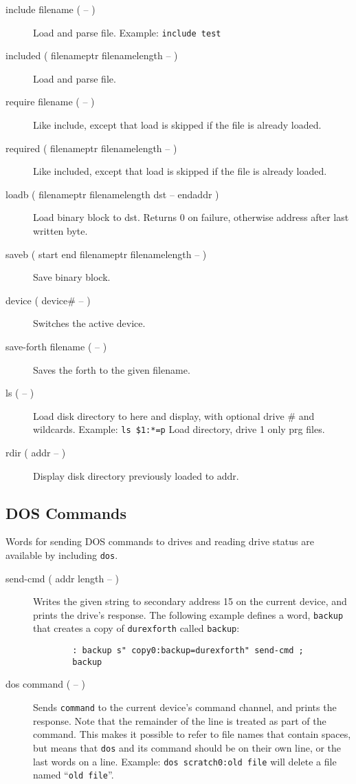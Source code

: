 \begin{description}
\item[include filename ( -- )] Load and parse file. Example: \texttt{include test}
\item[included ( filenameptr filenamelength -- )] Load and parse file.
\item[require filename ( -- )] Like include, except that load is skipped if the file is already loaded.
\item[required ( filenameptr filenamelength -- )] Like included, except that load is skipped if the file is already loaded.
\item[loadb ( filenameptr filenamelength dst -- endaddr )] Load binary block to dst. Returns 0 on failure, otherwise address after last written byte.
\item[saveb ( start end filenameptr filenamelength -- )] Save binary block.
\item[device ( device\# -- )] Switches the active device.
\item[save-forth filename ( -- )] Saves the forth to the given filename.
\item[ls ( -- )] Load disk directory to here and display, with optional drive \# and wildcards. Example: \texttt{ls \$1:*=p} Load directory, drive 1 only prg files.
\item[rdir ( addr -- )] Display disk directory previously loaded to addr.
\end{description}

\subsection{DOS Commands}

Words for sending DOS commands to drives and reading drive status are available by including \texttt{dos}.

\begin{description}
    \item[send-cmd ( addr length -- )] Writes the given string to secondary address 15 on the current device, and prints the drive's response. The following example defines a word, \texttt{backup} that creates a copy of \texttt{durexforth} called \texttt{backup}:
    \begin{verbatim}
        : backup s" copy0:backup=durexforth" send-cmd ;
        backup
    \end{verbatim}

    \item[dos command ( -- )] Sends \texttt{command} to the current device's command channel, and prints the response. Note that the remainder of the line is treated as part of the command. This makes it possible to refer to file names that contain spaces, but means that \texttt{dos} and its command should be on their own line, or the last words on a line. Example: \texttt{dos scratch0:old file} will delete a file named ``\texttt{old file}''.
\end{description}

